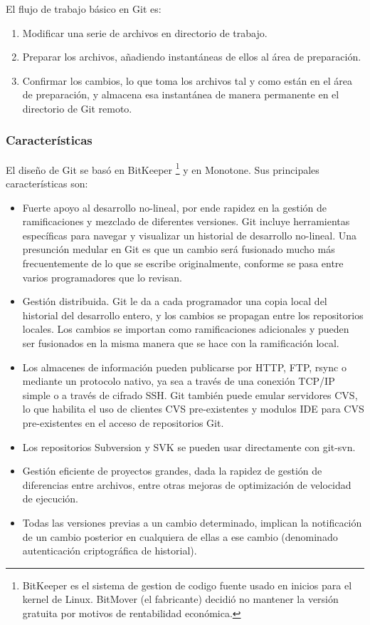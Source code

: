 El flujo de trabajo básico en Git es:
\begin{enumerate}
	\item{Modificar una serie de archivos en directorio de trabajo.}
	\item{Preparar los archivos, añadiendo instantáneas de ellos al área de preparación.}
	\item{Confirmar los cambios, lo que toma los archivos tal y como están en el área de preparación, y almacena esa instantánea de manera permanente en el directorio de Git remoto.}
\end{enumerate}
	

\subsubsection {Características}

El diseño de Git se basó en BitKeeper \footnote{BitKeeper es el sistema de gestion de codigo fuente usado en inicios para el kernel de Linux. BitMover (el fabricante) decidió no mantener la versión gratuita por motivos de rentabilidad económica.} y en Monotone. 
Sus principales características son:

\begin{itemize}
	\item{
		Fuerte apoyo al desarrollo no-lineal, por ende rapidez en la gestión de ramificaciones y mezclado de diferentes versiones. Git incluye herramientas específicas para navegar y visualizar un historial de desarrollo no-lineal. Una presunción medular en Git es que un cambio será fusionado mucho más frecuentemente de lo que se escribe originalmente, conforme se pasa entre varios programadores que lo revisan.
	}
	\item{
		Gestión distribuida. Git le da a cada programador una copia local del historial del desarrollo entero, y los cambios se propagan entre los repositorios locales. Los cambios se importan como ramificaciones adicionales y pueden ser fusionados en la misma manera que se hace con la ramificación local.
	}
	\item{
		Los almacenes de información pueden publicarse por HTTP, FTP, rsync o mediante un protocolo nativo, ya sea a través de una conexión TCP/IP simple o a través de cifrado SSH. Git también puede emular servidores CVS, lo que habilita el uso de clientes CVS pre-existentes y modulos IDE para CVS pre-existentes en el acceso de repositorios Git.
	}
	\item{
	 	Los repositorios Subversion y SVK se pueden usar directamente con git-svn.
	}
	\item{
		Gestión eficiente de proyectos grandes, dada la rapidez de gestión de diferencias entre archivos, entre otras mejoras de optimización de velocidad de ejecución.
	}
	\item{
		Todas las versiones previas a un cambio determinado, implican la notificación de un cambio posterior en cualquiera de ellas a ese cambio (denominado autenticación criptográfica de historial).
	}
\end{itemize}


